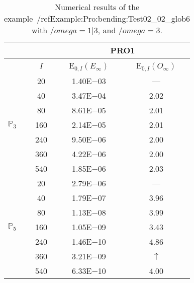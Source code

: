 \begin{table}[H]
\caption{Numerical results of the example~/ref{Example:Pro:bending:Test02_02_glob6} with $/omega=1|3$, and $/omega=3$.}
\setlength{\tabcolsep}{5pt}
\centering
\begin{tabular}{@{}l c c c@{}}
\toprule
 &  & \multicolumn{2}{c}{PRO1}\\
\midrule
 & $I$ & E$_{0,I}(E_{\infty})$ & E$_{0,I}(O_{\infty})$\\
\midrule
\multirow{7}{*}{$\mathbb{P}_{3}$}
 & 20 & 1.40E$-$03 & ---\\
 & 40 & 3.47E$-$04 & 2.02\\
 & 80 & 8.61E$-$05 & 2.01\\
 & 160 & 2.14E$-$05 & 2.01\\
 & 240 & 9.50E$-$06 & 2.00\\
 & 360 & 4.22E$-$06 & 2.00\\
 & 540 & 1.85E$-$06 & 2.03\\
\midrule
\multirow{7}{*}{$\mathbb{P}_{5}$}
 & 20 & 2.79E$-$06 & ---\\
 & 40 & 1.79E$-$07 & 3.96\\
 & 80 & 1.13E$-$08 & 3.99\\
 & 160 & 1.05E$-$09 & 3.43\\
 & 240 & 1.46E$-$10 & 4.86\\
 & 360 & 3.21E$-$09 & $\uparrow$\\
 & 540 & 6.33E$-$10 & 4.00\\
\bottomrule
\end{tabular}
\label{Table:PRO:test_02_02_test23_pro2}
\end{table}
